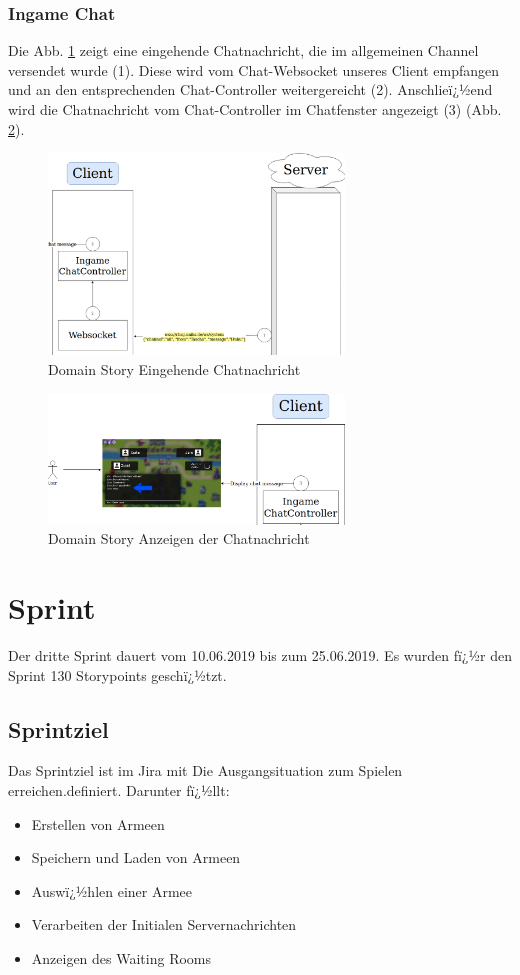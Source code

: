 \documentclass[12pt, titlepage]{scrartcl}
\newcommand{\RN}[1]{%
	\textup{\uppercase\expandafter{\romannumeral#1}}%
}
\begin{document}
		\subsubsection{Ingame Chat}
		Die Abb. \ref{DomainStoryChat1} zeigt eine eingehende Chatnachricht, die im allgemeinen Channel versendet wurde (1). Diese wird vom Chat-Websocket unseres Client empfangen und an den entsprechenden Chat-Controller weitergereicht (2). Anschlieï¿½end wird die Chatnachricht vom Chat-Controller im Chatfenster angezeigt (3) (Abb. \ref{DomainStoryChat2}).
			\begin{figure}[H] 
				\centering
				\includegraphics[width=0.7\textwidth]{Chat1.png}
				\caption{Domain Story Eingehende Chatnachricht}
				\label{DomainStoryChat1}
			\end{figure}
			\begin{figure}[H] 
				\centering
				\includegraphics[width=0.7\textwidth]{Chat2.png}
				\caption{Domain Story Anzeigen der Chatnachricht}
				\label{DomainStoryChat2}
			\end{figure}
	\section{Sprint \RN{3}}
		Der dritte Sprint dauert vom 10.06.2019 bis zum 25.06.2019. Es wurden fï¿½r den Sprint 130 Storypoints geschï¿½tzt.
		\subsection{Sprintziel}
		Das Sprintziel ist im Jira mit \glqq Die Ausgangsituation zum Spielen erreichen.\grqq definiert. Darunter fï¿½llt:
		\begin{itemize}
			\item Erstellen von Armeen
			\item Speichern und Laden von Armeen
			\item Auswï¿½hlen einer Armee
			\item Verarbeiten der Initialen Servernachrichten
			\item Anzeigen des Waiting Rooms
		\end{itemize}
\end{document}
